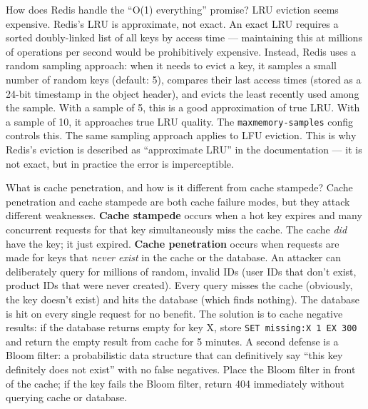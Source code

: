 \documentclass[11pt,a4paper]{article}
\begin{document}
\vspace{6pt}

\begin{curiobox}{How does Redis handle the ``O(1) everything'' promise? LRU eviction seems expensive.}
Redis's LRU is approximate, not exact. An exact LRU requires a sorted doubly-linked list of all keys by access time --- maintaining this at millions of operations per second would be prohibitively expensive. Instead, Redis uses a random sampling approach: when it needs to evict a key, it samples a small number of random keys (default: 5), compares their last access times (stored as a 24-bit timestamp in the object header), and evicts the least recently used among the sample. With a sample of 5, this is a good approximation of true LRU. With a sample of 10, it approaches true LRU quality. The \texttt{maxmemory-samples} config controls this. The same sampling approach applies to LFU eviction. This is why Redis's eviction is described as ``approximate LRU'' in the documentation --- it is not exact, but in practice the error is imperceptible.
\end{curiobox}

\vspace{6pt}

\begin{curiobox}{What is cache penetration, and how is it different from cache stampede?}
Cache penetration and cache stampede are both cache failure modes, but they attack different weaknesses. \textbf{Cache stampede} occurs when a hot key expires and many concurrent requests for that key simultaneously miss the cache. The cache \emph{did} have the key; it just expired. \textbf{Cache penetration} occurs when requests are made for keys that \emph{never exist} in the cache or the database. An attacker can deliberately query for millions of random, invalid IDs (user IDs that don't exist, product IDs that were never created). Every query misses the cache (obviously, the key doesn't exist) and hits the database (which finds nothing). The database is hit on every single request for no benefit. The solution is to cache negative results: if the database returns empty for key X, store \texttt{SET missing:X 1 EX 300} and return the empty result from cache for 5 minutes. A second defense is a Bloom filter: a probabilistic data structure that can definitively say ``this key definitely does not exist'' with no false negatives. Place the Bloom filter in front of the cache; if the key fails the Bloom filter, return 404 immediately without querying cache or database.
\end{curiobox}
\end{document}

